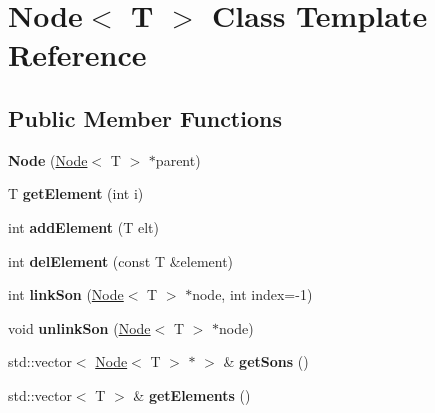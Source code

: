 \hypertarget{classNode}{
\section{Node$<$ T $>$ Class Template Reference}
\label{classNode}
}
\subsection*{Public Member Functions}
\begin{DoxyCompactItemize}
\item 
\hypertarget{classNode_a2503c255b891bffa72de5bf8d588fc0e}{
{\bfseries Node} (\hyperlink{classNode}{Node}$<$ T $>$ $\ast$parent)}
\label{classNode_a2503c255b891bffa72de5bf8d588fc0e}

\item 
\hypertarget{classNode_adbddcb0e025a2d63bd5c5b7384b208bb}{
T {\bfseries getElement} (int i)}
\label{classNode_adbddcb0e025a2d63bd5c5b7384b208bb}

\item 
\hypertarget{classNode_ab1c287487ed356d528fc238060285411}{
int {\bfseries addElement} (T elt)}
\label{classNode_ab1c287487ed356d528fc238060285411}

\item 
\hypertarget{classNode_a7a34d5a62bb07d206d0ebe1076c102a6}{
int {\bfseries delElement} (const T \&element)}
\label{classNode_a7a34d5a62bb07d206d0ebe1076c102a6}

\item 
\hypertarget{classNode_a1ce62ee002d51b8605cf1639e9781943}{
int {\bfseries linkSon} (\hyperlink{classNode}{Node}$<$ T $>$ $\ast$node, int index=-\/1)}
\label{classNode_a1ce62ee002d51b8605cf1639e9781943}

\item 
\hypertarget{classNode_afdae887bde082e5648f8b2986e8c240f}{
void {\bfseries unlinkSon} (\hyperlink{classNode}{Node}$<$ T $>$ $\ast$node)}
\label{classNode_afdae887bde082e5648f8b2986e8c240f}

\item 
\hypertarget{classNode_a984dbf53bc2ffa4eb3ead39b91b038b0}{
std::vector$<$ \hyperlink{classNode}{Node}$<$ T $>$ $\ast$ $>$ \& {\bfseries getSons} ()}
\label{classNode_a984dbf53bc2ffa4eb3ead39b91b038b0}

\item 
\hypertarget{classNode_a95fd498cb7e705440eec1fc39e851aba}{
std::vector$<$ T $>$ \& {\bfseries getElements} ()}
\label{classNode_a95fd498cb7e705440eec1fc39e851aba}


\end{DoxyCompactItemize}
